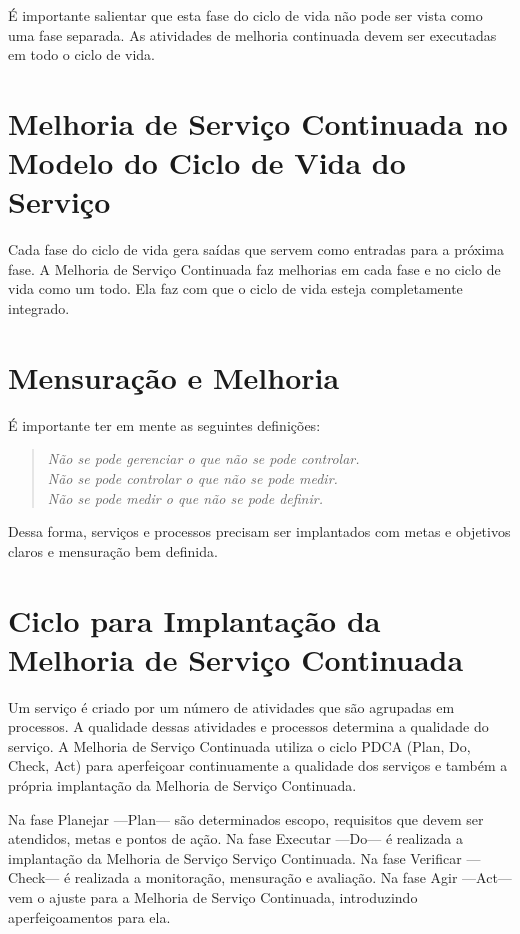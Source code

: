 É importante salientar que esta fase do ciclo de vida não pode ser vista como
uma fase separada. As atividades de melhoria continuada devem ser executadas em
todo o ciclo de vida.


\section{Melhoria de Serviço Continuada no Modelo do Ciclo de Vida do Serviço}
\label{sec:enhan:melhoria}
Cada fase do ciclo de vida gera saídas que servem como entradas para a próxima
fase. A Melhoria de Serviço Continuada faz melhorias em cada fase e no ciclo de
vida como um todo. Ela faz com que o ciclo de vida esteja completamente
integrado.


\section{Mensuração e Melhoria}
\label{sec:enhan:mensura}
É importante ter em mente as seguintes definições:
\begin{quote}
\emph{Não se pode gerenciar o que não se pode controlar.\\
Não se pode controlar o que não se pode medir.\\
Não se pode medir o que não se pode definir.}
\end{quote}

Dessa forma, serviços e processos precisam ser implantados com metas e
objetivos claros e mensuração bem definida.


\section{Ciclo para Implantação da Melhoria de Serviço Continuada}
\label{sec:enhan:ciclo}
Um  serviço é criado por um número de atividades que são agrupadas em
processos. A qualidade dessas atividades e processos determina a qualidade do
serviço. A Melhoria de Serviço Continuada utiliza o ciclo PDCA (Plan, Do,
Check, Act) para aperfeiçoar continuamente a qualidade dos serviços e também a
própria implantação da Melhoria de Serviço Continuada.

Na fase Planejar ---Plan--- são determinados escopo, requisitos que devem ser
atendidos, metas e pontos de ação. Na fase Executar ---Do--- é realizada a
implantação da Melhoria de Serviço Serviço Continuada. Na fase Verificar
---Check--- é realizada a monitoração, mensuração e avaliação. Na fase Agir
---Act--- vem o ajuste para a Melhoria de Serviço Continuada, introduzindo
aperfeiçoamentos para ela.


